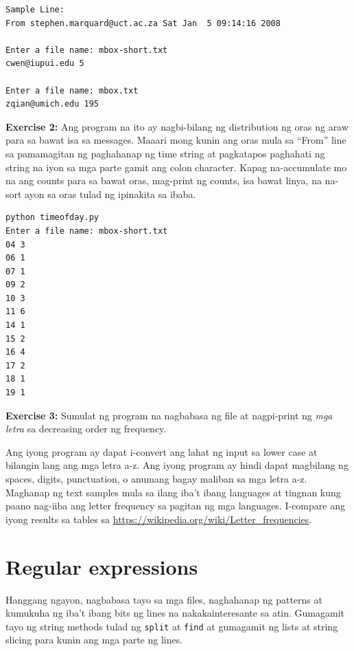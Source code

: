 \documentclass[10pt,]{book}
\begin{document}
{\small
\begin{verbatim}
Sample Line:
From stephen.marquard@uct.ac.za Sat Jan  5 09:14:16 2008

Enter a file name: mbox-short.txt
cwen@iupui.edu 5

Enter a file name: mbox.txt
zqian@umich.edu 195
\end{verbatim}
}

\textbf{Exercise 2:} Ang program na ito ay nagbi-bilang ng distribution
ng oras ng araw para sa bawat isa sa messages. Maaari mong kunin ang
oras mula sa ``From'' line sa pamamagitan ng paghahanap ng time string
at pagkatapos paghahati ng string na iyon sa mga parte gamit ang colon
character. Kapag na-accumulate mo na ang counts para sa bawat oras,
mag-print ng counts, isa bawat linya, na na-sort ayon sa oras tulad ng
ipinakita sa ibaba.

{\small
\begin{verbatim}
python timeofday.py
Enter a file name: mbox-short.txt
04 3
06 1
07 1
09 2
10 3
11 6
14 1
15 2
16 4
17 2
18 1
19 1
\end{verbatim}
}

\textbf{Exercise 3:} Sumulat ng program na nagbabasa ng file at
nagpi-print ng \emph{mga letra} sa decreasing order ng frequency.

Ang iyong program ay dapat i-convert ang lahat ng input sa lower case at
bilangin lang ang mga letra a-z. Ang iyong program ay hindi dapat
magbilang ng spaces, digits, punctuation, o anumang bagay maliban sa mga
letra a-z. Maghanap ng text samples mula sa ilang iba't ibang languages
at tingnan kung paano nag-iiba ang letter frequency sa pagitan ng mga
languages. I-compare ang iyong results sa tables sa
\url{https://wikipedia.org/wiki/Letter_frequencies}.

 

\chapter{Regular expressions}\label{regular-expressions}

Hanggang ngayon, nagbabasa tayo sa mga files, naghahanap ng patterns at
kumukuha ng iba't ibang bits ng lines na nakakainteresante sa atin.
Gumagamit tayo ng string methods tulad ng \texttt{split} at
\texttt{find} at gumagamit ng lists at string slicing para kunin ang mga
parte ng lines.

  
\end{document}
